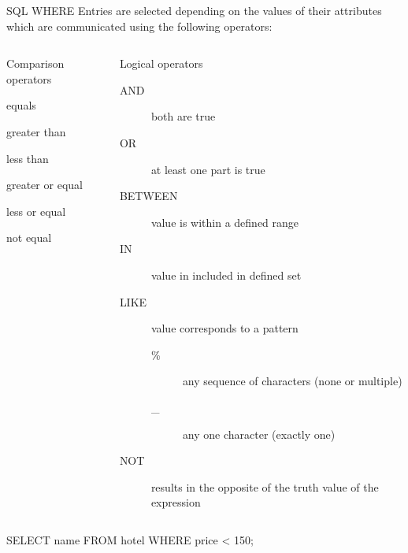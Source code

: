 \begin{frame}[fragile]{SQL WHERE}
\small 
Entries are selected depending on the values of their attributes which are communicated using the following operators:
\begin{columns}
  \begin{block}{Comparison operators}
    \begin{description}\footnotesize
      \item[=] equals
      \item[>] greater than
      \item[<] less than
      \item[>=] greater or equal
      \item[<=] less or equal
      \item[!= or <>] not equal
    \end{description}
  \end{block}

  \begin{block}{Logical operators}\footnotesize
    \begin{description}
      \item[AND] both are true
      \item[OR] at least one part is true
      \item[BETWEEN] value is within a defined range
      \item[IN] value in included in defined set
      \item[LIKE] value corresponds to a pattern
      \begin{description}
        \item[\%] any sequence of characters (none or multiple)
        \item[\_] any one character (exactly one)
      \end{description}
      \item[NOT] results in the opposite of the truth value of the expression
    \end{description}
  \end{block}
\end{columns}
\begin{sqlcode}
SELECT name FROM hotel WHERE price < 150;
\end{sqlcode}
\end{frame}

